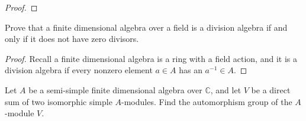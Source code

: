 \documentclass[openany]{book}
\begin{document}
\begin{proof}
    




\end{proof}

\begin{prob}
    Prove that a finite dimensional algebra over a field is a division algebra if and only if it does not have zero divisors.
\end{prob}
\begin{proof}
    Recall a finite dimensional algebra is a ring with a field action, and it is a division algebra if every nonzero element $a\in A$ has an $a^{-1}\in A$.
\end{proof}


\begin{prob}
    Let \(A\) be a semi-simple finite dimensional algebra over \(\mathbb{C}\), and let \(V\) be a direct sum of two isomorphic simple \(A\)-modules. Find the automorphism group of the \(A\)-module \(V\).
\end{prob}
\end{document}
